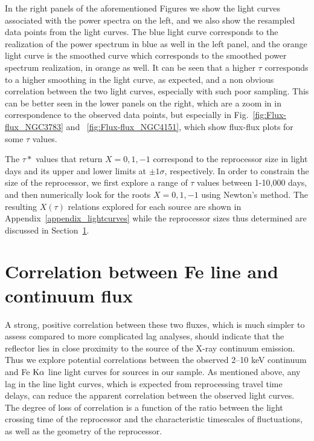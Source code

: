     In the right panels of the aforementioned Figures we show the light curves associated with the power spectra on the left, and we also show the resampled data points from the light curves. The blue light curve corresponds to the realization of the power spectrum in blue as well in the left panel, and the orange light curve is the smoothed curve which corresponds to the smoothed power spectrum realization, in orange as well. It can be seen that a higher $\tau$ corresponds to a higher smoothing in the light curve, as expected, and a non obvious correlation between the two light curves, especially with such poor sampling. This can be better seen in the lower panels on the right, which are a zoom in in correspondence to the observed data points, but especially in Fig.~\ref{fig:Flux-flux_NGC3783} and ~\ref{fig:Flux-flux_NGC4151}, which show flux-flux plots for some $\tau$ values. 
 
The $\tau*$ values that return $X=0,1,-1$ correspond to the reprocessor size in light days and its upper and lower limits at $\pm1\sigma$, respectively. In order to constrain the size of the reprocessor, we first explore a range of $\tau$ values between 1-10,000 days, and then numerically look for the roots $X=0,1,-1$ using Newton's method. The resulting $X(\tau)$ relations explored for each source are shown in Appendix~\ref{appendix_lightcurves} while the reprocessor sizes thus determined are discussed in Section~\ref{sec:lc_results}.

\section{Correlation between Fe line and continuum flux} \label{sec:lc_results}

A strong, positive correlation between these two fluxes, which is much simpler to assess compared to more complicated lag analyses, should indicate that the reflector lies in close proximity to the source of the X-ray continuum emission. 
Thus we explore potential correlations between the observed 2--10 keV continuum and Fe $\rm K\alpha$ line light curves for sources in our sample. As mentioned above, any lag in the \kalfa{} line light curves, which is expected from reprocessing travel time delays, can reduce the apparent correlation between the observed light curves. The degree of loss of correlation is a function of the ratio between the light crossing time of the reprocessor and the characteristic timescales of fluctuations, as well as the geometry of the reprocessor. 

